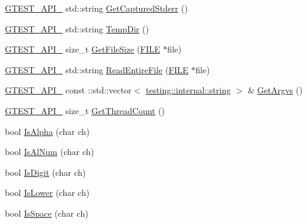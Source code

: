 \begin{DoxyCompactItemize}
\item 
\hyperlink{gtest-port_8h_aa73be6f0ba4a7456180a94904ce17790}{G\+T\+E\+S\+T\+\_\+\+A\+P\+I\+\_\+} std\+::string \hyperlink{namespacetesting_1_1internal_a374156401da17704099d0c33fa53adfb}{Get\+Captured\+Stderr} ()
\item 
\hyperlink{gtest-port_8h_aa73be6f0ba4a7456180a94904ce17790}{G\+T\+E\+S\+T\+\_\+\+A\+P\+I\+\_\+} std\+::string \hyperlink{namespacetesting_1_1internal_a59a959f437bd7d515b5c41dcf00229c9}{Temp\+Dir} ()
\item 
\hyperlink{gtest-port_8h_aa73be6f0ba4a7456180a94904ce17790}{G\+T\+E\+S\+T\+\_\+\+A\+P\+I\+\_\+} size\+\_\+t \hyperlink{namespacetesting_1_1internal_a06ca3f65f5e85c9ce7299b9e4cd52408}{Get\+File\+Size} (\hyperlink{gmock__output__test__golden_8txt_ab12dc6c67167ae2f0af132bdd8c2955e}{F\+I\+LE} $\ast$file)
\item 
\hyperlink{gtest-port_8h_aa73be6f0ba4a7456180a94904ce17790}{G\+T\+E\+S\+T\+\_\+\+A\+P\+I\+\_\+} std\+::string \hyperlink{namespacetesting_1_1internal_a2cc0be60c54a8701423fe5297e1349ee}{Read\+Entire\+File} (\hyperlink{gmock__output__test__golden_8txt_ab12dc6c67167ae2f0af132bdd8c2955e}{F\+I\+LE} $\ast$file)
\item 
\hyperlink{gtest-port_8h_aa73be6f0ba4a7456180a94904ce17790}{G\+T\+E\+S\+T\+\_\+\+A\+P\+I\+\_\+} const \+::std\+::vector$<$ \hyperlink{namespacetesting_1_1internal_a8e8ff5b11e64078831112677156cb111}{testing\+::internal\+::string} $>$ \& \hyperlink{namespacetesting_1_1internal_a344160f771a3b754fa4e54b6e9846b23}{Get\+Argvs} ()
\item 
\hyperlink{gtest-port_8h_aa73be6f0ba4a7456180a94904ce17790}{G\+T\+E\+S\+T\+\_\+\+A\+P\+I\+\_\+} size\+\_\+t \hyperlink{namespacetesting_1_1internal_a3b9b3649cd04558bf46c75de52a7ef34}{Get\+Thread\+Count} ()
\item 
bool \hyperlink{namespacetesting_1_1internal_aeb957087fd6bbf9db98ab7cd41b0c129}{Is\+Alpha} (char ch)
\item 
bool \hyperlink{namespacetesting_1_1internal_a83802e7f23324cd512232203662e1a98}{Is\+Al\+Num} (char ch)
\item 
bool \hyperlink{namespacetesting_1_1internal_a4bd96b7fa6486802d33ddc217af55a39}{Is\+Digit} (char ch)
\item 
bool \hyperlink{namespacetesting_1_1internal_ac26ce3883bc8919c27074975e958f3b7}{Is\+Lower} (char ch)
\item 
bool \hyperlink{namespacetesting_1_1internal_af429e04f70f9c10f6aa76a5d1ccd389f}{Is\+Space} (char ch)
\item 

\end{DoxyCompactItemize}
